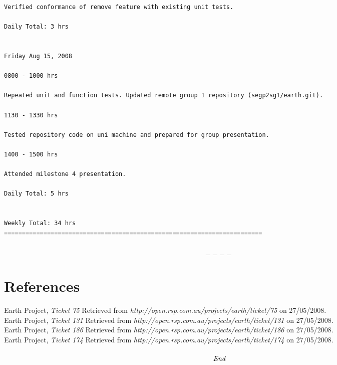 \documentclass[10pt,a4,oneside]{article}
\begin{document}
\begin{mylisting}
\begin{verbatim}
Verified conformance of remove feature with existing unit tests.

Daily Total: 3 hrs


Friday Aug 15, 2008

0800 - 1000 hrs

Repeated unit and function tests. Updated remote group 1 repository (segp2sg1/earth.git).

1130 - 1330 hrs

Tested repository code on uni machine and prepared for group presentation.

1400 - 1500 hrs

Attended milestone 4 presentation.

Daily Total: 5 hrs


Weekly Total: 34 hrs
========================================================================


\end{verbatim}
\end{mylisting}

\[----\]

\newpage

\section{References}

Earth Project, \textit{Ticket 75} Retrieved from \emph{http://open.rsp.com.au/projects/earth/ticket/75} on 27/05/2008.\\
\newline
Earth Project, \textit{Ticket 131} Retrieved from \emph{http://open.rsp.com.au/projects/earth/ticket/131} on 27/05/2008.\\
\newline
Earth Project, \textit{Ticket 186} Retrieved from \emph{http://open.rsp.com.au/projects/earth/ticket/186} on 27/05/2008.\\
\newline
Earth Project, \textit{Ticket 174} Retrieved from \emph{http://open.rsp.com.au/projects/earth/ticket/174} on 27/05/2008.\\

\paragraph{}

\[\emph{End}\]
\end{document}
